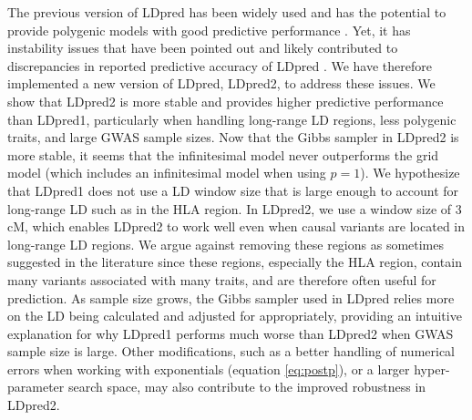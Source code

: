 \documentclass{bioinfo}
\begin{document}
The previous version of LDpred has been widely used and has the potential to provide polygenic models with good predictive performance \cite[]{khera2018genome}. 
Yet, it has instability issues that have been pointed out \cite[]{marquez2018modeling,lloyd2019improved} and likely contributed to discrepancies in reported predictive accuracy of LDpred \cite[]{choi2019prsice,ge2019polygenic,chun2020non}.
We have therefore implemented a new version of LDpred, LDpred2, to address these issues.
We show that LDpred2 is more stable and provides higher predictive performance than LDpred1, particularly when handling long-range LD regions, less polygenic traits, and large GWAS sample sizes.
Now that the Gibbs sampler in LDpred2 is more stable, it seems that the infinitesimal model never outperforms the grid model (which includes an infinitesimal model when using $p=1$).
We hypothesize that LDpred1 does not use a LD window size that is large enough to account for long-range LD such as in the HLA region.
In LDpred2, we use a window size of 3 cM, which enables LDpred2 to work well even when causal variants are located in long-range LD regions.
We argue against removing these regions as sometimes suggested in the literature \cite[]{marquez2018modeling,lloyd2019improved} since these regions, especially the HLA region, contain many variants associated with many traits, and are therefore often useful for prediction.
As sample size grows, the Gibbs sampler used in LDpred relies more on the LD being calculated and adjusted for appropriately, providing an intuitive explanation for why LDpred1 performs much worse than LDpred2 when GWAS sample size is large.
Other modifications, such as a better handling of numerical errors when working with exponentials (equation \eqref{eq:postp}), or a larger hyper-parameter search space, may also contribute to the improved robustness in LDpred2.
\end{document}
